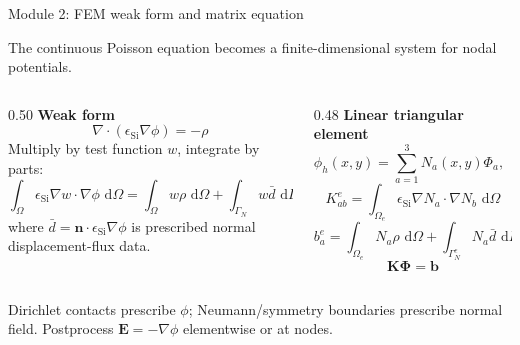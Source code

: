\documentclass[aspectratio=169,9pt]{beamer}
\newcommand{\dd}{\,\mathrm{d}}
\newcommand{\grad}{\nabla}
\newcommand{\divg}{\nabla\!\cdot}
\newcommand{\E}{\bm{E}}
\newcommand{\epsSi}{\epsilon_{\mathrm{Si}}}
\newcommand{\vect}[1]{\bm{#1}}
\newcommand{\mat}[1]{\mathbf{#1}}
\begin{document}
\begin{frame}{Module 2: FEM weak form and matrix equation}
\footnotesize
\vspace{-3mm}
\begin{bluebox}
\centering
The continuous Poisson equation becomes a finite-dimensional system for nodal potentials.
\end{bluebox}

\vspace{1mm}
\begin{columns}[T,totalwidth=\textwidth]
\begin{column}{0.50\textwidth}
\textbf{Weak form}
\begin{equation*}
\divg(\epsSi \grad\phi)=-\rho
\end{equation*}
Multiply by test function \(w\), integrate by parts:
\begin{equation*}
\boxed{\int_{\Omega}\epsSi\grad w\cdot\grad\phi\,\dd\Omega
=\int_{\Omega}w\rho\,\dd\Omega + \int_{\Gamma_N}w\bar{d}\,\dd\Gamma}
\end{equation*}
where \(\bar{d}=\vect{n}\cdot\epsSi\grad\phi\) is prescribed normal displacement-flux data.
\end{column}
\begin{column}{0.48\textwidth}
\textbf{Linear triangular element}
\begin{equation*}
\phi_h(x,y)=\sum_{a=1}^{3}N_a(x,y)\Phi_a,
\qquad
w_h=N_b.
\end{equation*}
\begin{equation*}
\boxed{K^e_{ab}=\int_{\Omega_e}\epsSi\grad N_a\cdot\grad N_b\,\dd\Omega}
\end{equation*}
\begin{equation*}
\boxed{b^e_a=\int_{\Omega_e}N_a\rho\,\dd\Omega+\int_{\Gamma^e_N}N_a\bar{d}\,\dd\Gamma}
\end{equation*}
\begin{equation*}
\boxed{\mat{K}\vect{\Phi}=\vect{b}}
\end{equation*}
\end{column}
\end{columns}

\vspace{1mm}
\begin{orangebox}
\centering\scriptsize
Dirichlet contacts prescribe \(\phi\); Neumann/symmetry boundaries prescribe normal field.  Postprocess \(\E=-\grad\phi\) elementwise or at nodes.
\end{orangebox}
\end{frame}
\end{document}
